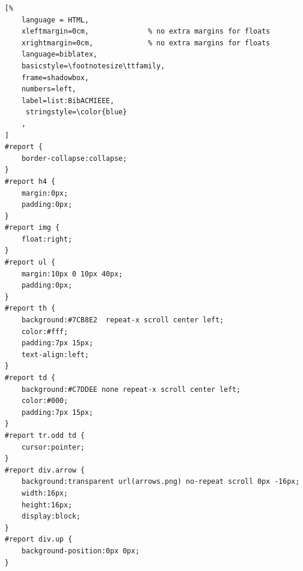 \begin{lstlisting}[%
    language = HTML,
    xleftmargin=0cm,              % no extra margins for floats
    xrightmargin=0cm,             % no extra margins for floats
    language=biblatex,
    basicstyle=\footnotesize\ttfamily,
    frame=shadowbox,
    numbers=left,
    label=list:BibACMIEEE,
     stringstyle=\color{blue}
    ,
]
#report {
    border-collapse:collapse;
}
#report h4 {
    margin:0px;
    padding:0px;
}
#report img {
    float:right;
}
#report ul {
    margin:10px 0 10px 40px;
    padding:0px;
}
#report th {
    background:#7CB8E2  repeat-x scroll center left;
    color:#fff;
    padding:7px 15px;
    text-align:left;
}
#report td {
    background:#C7DDEE none repeat-x scroll center left;
    color:#000;
    padding:7px 15px;
}
#report tr.odd td {
    cursor:pointer;
}
#report div.arrow {
    background:transparent url(arrows.png) no-repeat scroll 0px -16px;
    width:16px;
    height:16px;
    display:block;
}
#report div.up {
    background-position:0px 0px;
}
\end{lstlisting}


